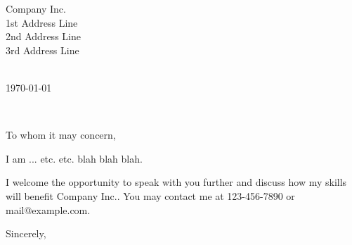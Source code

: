 \documentclass[11pt,a4paper]{letter} %
\makeatletter
\def\Email{mail@example.com} %
\def\Telephone{123-456-7890} %
\def\opening#1{\thispagestyle{empty}
{\centering\fromaddress \vspace{0.6in} \\ %
\hspace*{\longindentation}\today\hspace*{\fill}\par} %
{\raggedright \toname \\ \toaddress \par} %
\vspace{0.4in} %
\noindent #1 %
}
\makeatother
\begin{document}

\def\Company{Company Inc.}
\begin{letter}
{\Company{} \\
1st Address Line \\
2nd Address Line \\
3rd Address Line \\
}


\opening{To whom it may concern,}

I am ... etc. etc. blah blah blah.

I welcome the opportunity to speak with you further and discuss how my skills will benefit \Company{}. You may contact me at \Telephone{} or \Email{}.

\closing{Sincerely,}


\end{letter}
\end{document}
